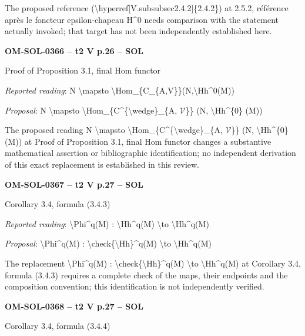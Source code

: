 The proposed reference (\textbackslash{}hyperref[V.subsubsec2.4.2]\{2.4.2\}) at 2.5.2, référence après le foncteur epsilon-chapeau H\textasciicircum{}0 needs comparison with the statement actually invoked; that target has not been independently established here.\par
\par\noindent\textbf{OM-SOL-0366 -- t2 V p.26 -- SOL}\par
Proof of Proposition 3.1, final Hom functor\par
\emph{Reported reading}: N \textbackslash{}mapsto \textbackslash{}Hom\_\{C\_\{A,V\}\}(N,\textbackslash{}Hh\textasciicircum{}0(M))\par
\emph{Proposal}: N \textbackslash{}mapsto \textbackslash{}Hom\_\{C\textasciicircum{}\{\textbackslash{}wedge\}\_\{A, \ensuremath{𝒱}\}\} (N, \textbackslash{}Hh\textasciicircum{}\{0\} (M))\par
The proposed reading N \textbackslash{}mapsto \textbackslash{}Hom\_\{C\textasciicircum{}\{\textbackslash{}wedge\}\_\{A, \ensuremath{𝒱}\}\} (N, \textbackslash{}Hh\textasciicircum{}\{0\} (M)) at Proof of Proposition 3.1, final Hom functor changes a substantive mathematical assertion or bibliographic identification; no independent derivation of this exact replacement is established in this review.\par
\par\noindent\textbf{OM-SOL-0367 -- t2 V p.27 -- SOL}\par
Corollary 3.4, formula (3.4.3)\par
\emph{Reported reading}: \textbackslash{}Phi\textasciicircum{}q(M) : \textbackslash{}Hh\textasciicircum{}q(M) \textbackslash{}to \textbackslash{}Hh\textasciicircum{}q(M)\par
\emph{Proposal}: \textbackslash{}Phi\textasciicircum{}q(M) : \textbackslash{}check\{\textbackslash{}Hh\}\textasciicircum{}q(M) \textbackslash{}to \textbackslash{}Hh\textasciicircum{}q(M)\par
The replacement \textbackslash{}Phi\textasciicircum{}q(M) : \textbackslash{}check\{\textbackslash{}Hh\}\textasciicircum{}q(M) \textbackslash{}to \textbackslash{}Hh\textasciicircum{}q(M) at Corollary 3.4, formula (3.4.3) requires a complete check of the maps, their endpoints and the composition convention; this identification is not independently verified.\par
\par\noindent\textbf{OM-SOL-0368 -- t2 V p.27 -- SOL}\par
Corollary 3.4, formula (3.4.4)\par
